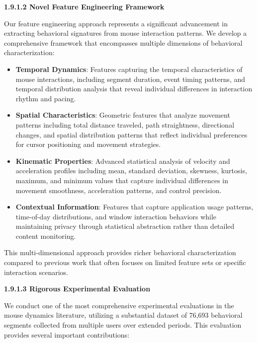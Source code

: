 \documentclass[
  12pt,
  a4paper,
]{report}
\begin{document}
\textbf{1.9.1.2 Novel Feature Engineering Framework}

Our feature engineering approach represents a significant advancement in
extracting behavioral signatures from mouse interaction patterns. We
develop a comprehensive framework that encompasses multiple dimensions
of behavioral characterization:

\begin{itemize}
\item
  \textbf{Temporal Dynamics}: Features capturing the temporal
  characteristics of mouse interactions, including segment duration,
  event timing patterns, and temporal distribution analysis that reveal
  individual differences in interaction rhythm and pacing.
\item
  \textbf{Spatial Characteristics}: Geometric features that analyze
  movement patterns including total distance traveled, path
  straightness, directional changes, and spatial distribution patterns
  that reflect individual preferences for cursor positioning and
  movement strategies.
\item
  \textbf{Kinematic Properties}: Advanced statistical analysis of
  velocity and acceleration profiles including mean, standard deviation,
  skewness, kurtosis, maximum, and minimum values that capture
  individual differences in movement smoothness, acceleration patterns,
  and control precision.
\item
  \textbf{Contextual Information}: Features that capture application
  usage patterns, time-of-day distributions, and window interaction
  behaviors while maintaining privacy through statistical abstraction
  rather than detailed content monitoring.
\end{itemize}

This multi-dimensional approach provides richer behavioral
characterization compared to previous work that often focuses on limited
feature sets or specific interaction scenarios.

\textbf{1.9.1.3 Rigorous Experimental Evaluation}

We conduct one of the most comprehensive experimental evaluations in the
mouse dynamics literature, utilizing a substantial dataset of 76,693
behavioral segments collected from multiple users over extended periods.
This evaluation provides several important contributions:
\end{document}
